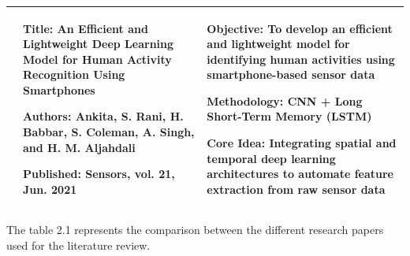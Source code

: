 \begin{center}
\begin{longtable}{
        |>{\centering\arraybackslash}m{1.22cm}
        |>{\raggedright\arraybackslash}m{6.3cm}
        |>{\raggedright\arraybackslash}m{6.3cm}|
        }
        11                                                                                           &
        \textbf{Title:} An Efficient and Lightweight Deep Learning Model for Human Activity Recognition Using Smartphones \par
        \textbf{Authors:} Ankita, S. Rani, H. Babbar, S. Coleman, A. Singh, and H. M. Aljahdali \par
        \textbf{Published:} Sensors, vol. 21, Jun. 2021                                              &
        \textbf{Objective:} To develop an efficient and lightweight model for identifying human activities using smartphone-based sensor data \par
        \textbf{Methodology:} CNN + Long Short-Term Memory (LSTM) \par
        \textbf{Core Idea:} Integrating spatial and temporal deep learning architectures to automate feature extraction from raw sensor data                                               \\
        \hline
    \end{longtable}
\end{center}

\vspace{-30pt}The table 2.1 represents the comparison between the different research papers used for the literature review.